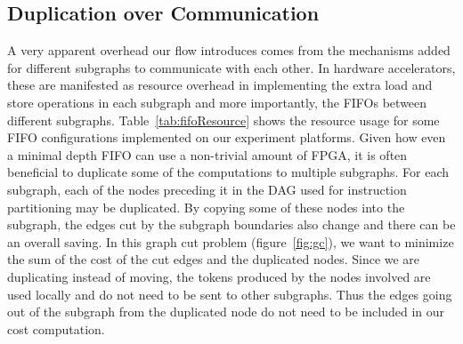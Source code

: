 \subsection{Duplication over Communication}
A very apparent overhead our flow introduces comes from the mechanisms added
for different subgraphs to communicate with each other. In hardware accelerators,
these are manifested as resource overhead in implementing the extra load and
store operations in each subgraph and more importantly, the FIFOs
between different subgraphs. Table~\ref{tab:fifoResource} shows the
resource usage for some FIFO configurations implemented on our experiment platforms. Given how even a minimal depth FIFO 
can use a non-trivial amount of FPGA, it is often beneficial to duplicate some of the computations to multiple subgraphs.
For each subgraph, each of the nodes preceding it in the DAG used for
instruction partitioning may be duplicated. By copying some of
these nodes into the subgraph, the edges cut by the subgraph boundaries
also change and there can be an overall saving. 
In this graph cut problem (figure~\ref{fig:gc}), we want to minimize the sum of the cost of the cut edges
and the duplicated nodes.  Since we are duplicating instead
of moving, the tokens produced by the nodes involved are used locally and do
not need to be sent to other subgraphs.
Thus the edges going out of the subgraph from the duplicated node do not need to be included in our cost computation. 


